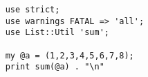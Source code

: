 \documentclass{article}
\begin{document}
\blindtext
\begin{verbatim}
    use strict;
    use warnings FATAL => 'all';
    use List::Util 'sum';
    
    my @a = (1,2,3,4,5,6,7,8);
    print sum(@a) . "\n"
\end{verbatim}
\end{document}
